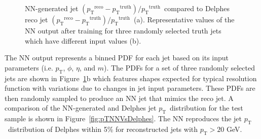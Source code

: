 \documentclass[showpacs,showkeys,preprint,prd,nofootinbib,linenumbers,12pt,superscriptaddress]{revtex4-1}
\def\pt{\ensuremath{p_{\mathrm{T}}}}
\def\ptRes{\ensuremath{(\pt^{\mathrm{reco}}-\pt^{\mathrm{truth}})/\pt^{\mathrm{truth}}}}
\begin{document}
\begin{figure}[htb]
  \caption{NN-generated jet \ptRes\ compared to Delphes reco jet \ptRes\ (a). Representative values of the NN output after training for three randomly selected truth jets which have different input values (b).}
  \label{fig:PDFComp}
\end{figure}

The NN output represents a binned PDF for each jet based on its input parameters (i.e. \pt, $\phi$, $\eta$, and $m$). The PDFs for a set of three randomly selected jets are shown in Figure~\ref{fig:PDFComp}b which features shapes expected for typical resolution function with variations due to changes in jet input parameters. These PDFs are then randomly sampled to produce an NN jet that mimics the reco jet. A comparison of the NN-generated and Delphes jet \pt\ distribution for the test sample is shown in Figure~\ref{fig:pTNNVsDelphes}. The NN reproduces the jet \pt\ distribution of Delphes within 5\% for reconstructed jets with $\pt>20$ GeV. 
\end{document}

